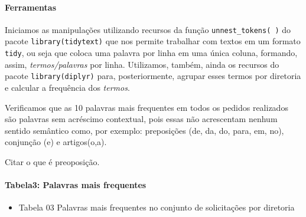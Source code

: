 \documentclass[]{article}
\newenvironment{Shaded}{\begin{snugshade}}{\end{snugshade}}
\newcommand{\KeywordTok}[1]{\textcolor[rgb]{0.13,0.29,0.53}{\textbf{#1}}}
\newcommand{\DataTypeTok}[1]{\textcolor[rgb]{0.13,0.29,0.53}{#1}}
\newcommand{\DecValTok}[1]{\textcolor[rgb]{0.00,0.00,0.81}{#1}}
\newcommand{\StringTok}[1]{\textcolor[rgb]{0.31,0.60,0.02}{#1}}
\newcommand{\OtherTok}[1]{\textcolor[rgb]{0.56,0.35,0.01}{#1}}
\newcommand{\OperatorTok}[1]{\textcolor[rgb]{0.81,0.36,0.00}{\textbf{#1}}}
\newcommand{\NormalTok}[1]{#1}
\providecommand{\tightlist}{%
  \setlength{\itemsep}{0pt}\setlength{\parskip}{0pt}}
\let\oldparagraph\paragraph
\renewcommand{\paragraph}[1]{\oldparagraph{#1}\mbox{}}
\begin{document}
\paragraph{Ferramentas}\label{ferramentas}

Iniciamos as manipulações utilizando recursos da função
\texttt{unnest\_tokens(\ )} do pacote \texttt{library(tidytext)} que nos
permite trabalhar com textos em um formato \texttt{tidy}, ou seja que
coloca uma palavra por linha em uma única coluna, formando, assim,
\emph{termos/palavras} por linha. Utilizamos, também, ainda os recursos
do pacote \texttt{library(diplyr)} para, posteriormente, agrupar esses
termos por diretoria e calcular a frequência dos \emph{termos}.

Verificamos que as 10 palavras mais frequentes em todos os pedidos
realizados são palavras sem acréscimo contextual, pois essas não
acrescentam nenhum sentido semântico como, por exemplo: preposições (de,
da, do, para, em, no), conjunção (e) e artigos(o,a).

Citar o que é preoposição.

\paragraph{Tabela3: Palavras mais
frequentes}\label{tabela3-palavras-mais-frequentes}

\begin{itemize}
\tightlist
\item
  Tabela 03 Palavras mais frequentes no conjunto de solicitações por
  diretoria
\end{itemize}

\begin{Shaded}
\end{Shaded}
\end{document}
